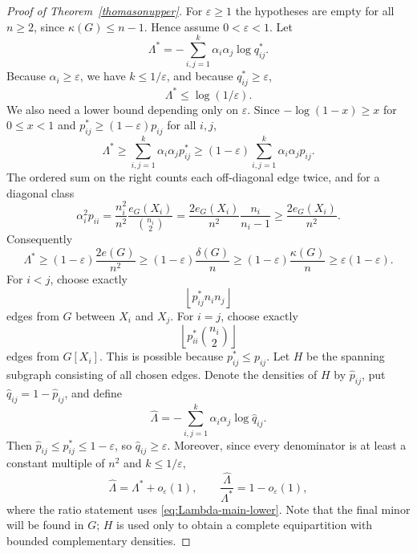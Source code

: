 \documentclass{article}
\newcommand{\eps}{\varepsilon}
\begin{document}
\begin{proof}[Proof of Theorem~\ref{thomasonupper}]
For $\eps\ge1$ the hypotheses are empty for all $n\ge2$, since $\kappa(G)\le n-1$.  Hence assume $0<\eps<1$.  Let
\[
 \Lambda^*=-\sum_{i,j=1}^k\alpha_i\alpha_j\log q_{ij}^*.
\]
Because $\alpha_i\ge\eps$, we have $k\le1/\eps$, and because $q_{ij}^*\ge\eps$,
\begin{equation}\label{eq:Lambda-main-upper}
 \Lambda^*\le\log(1/\eps).
\end{equation}
We also need a lower bound depending only on $\eps$.  Since $-\log(1-x)\ge x$ for $0\le x<1$ and $p_{ij}^*\ge(1-\eps)p_{ij}$ for all $i,j$,
\[
 \Lambda^*\ge\sum_{i,j=1}^k\alpha_i\alpha_jp_{ij}^*
 \ge(1-\eps)\sum_{i,j=1}^k\alpha_i\alpha_jp_{ij}.
\]
The ordered sum on the right counts each off-diagonal edge twice, and for a diagonal class
\[
 \alpha_i^2p_{ii}
 =\frac{n_i^2}{n^2}\frac{e_G(X_i)}{\binom{n_i}{2}}
 =\frac{2e_G(X_i)}{n^2}\frac{n_i}{n_i-1}
 \ge\frac{2e_G(X_i)}{n^2}.
\]
Consequently
\begin{equation}\label{eq:Lambda-main-lower}
 \Lambda^*\ge (1-\eps)\frac{2e(G)}{n^2}
 \ge (1-\eps)\frac{\delta(G)}n \ge (1-\eps)\frac{\kappa(G)}n
 \ge \eps(1-\eps).
\end{equation}
For $i<j$, choose exactly
\[
 \left\lfloor p_{ij}^* n_i n_j\right\rfloor
\]
edges from $G$ between $X_i$ and $X_j$.  For $i=j$, choose exactly
\[
 \left\lfloor p_{ii}^*\binom{n_i}{2}\right\rfloor
\]
edges from $G[X_i]$.  This is possible because $p_{ij}^*\le p_{ij}$.  Let $H$ be the spanning subgraph consisting of all chosen edges.  Denote the densities of $H$ by $\widehat p_{ij}$, put $\widehat q_{ij}=1-\widehat p_{ij}$, and define
\[
 \widehat\Lambda=-\sum_{i,j=1}^k\alpha_i\alpha_j\log \widehat q_{ij}.
\]
Then $\widehat p_{ij}\le p_{ij}^*\le1-\eps$, so $\widehat q_{ij}\ge\eps$.  Moreover, since every denominator is at least a constant multiple of $n^2$ and $k\le1/\eps$,
\begin{equation}\label{eq:hatLambda-close}
 \widehat\Lambda=\Lambda^*+o_{\eps}(1),
 \qquad
 \frac{\widehat\Lambda}{\Lambda^*}=1-o_{\eps}(1),
\end{equation}
where the ratio statement uses \eqref{eq:Lambda-main-lower}.  Note that the final minor will be found in $G$; $H$ is used only to obtain a complete equipartition with bounded complementary densities.


\end{proof}
\end{document}
